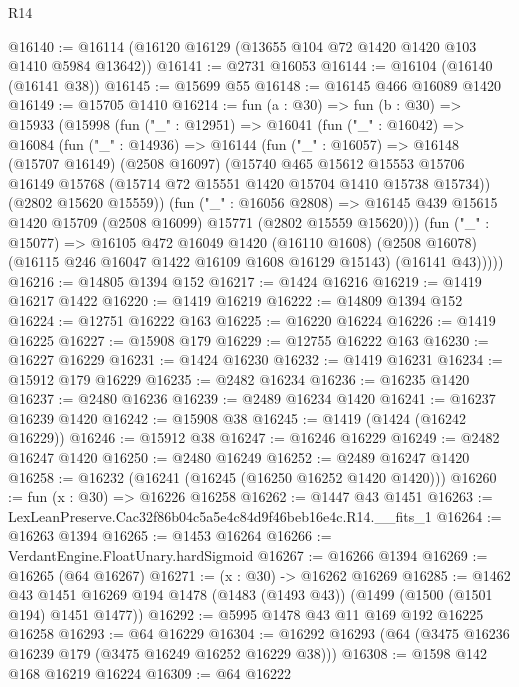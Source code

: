 \begin{lexlean}{R14}
\begin{coremodule}
@16140 := @16114 (@16120 @16129 (@13655 @104 @72 @1420 @1420 @103 @1410 @5984 @13642))
@16141 := @2731 @16053
@16144 := @16104 (@16140 (@16141 @38))
@16145 := @15699 @55
@16148 := @16145 @466 @16089 @1420
@16149 := @15705 @1410
@16214 := fun (a : @30) =>
  fun (b : @30) =>
  @15933
    (@15998
      (fun ("_" : @12951) =>
      @16041
        (fun ("_" : @16042) =>
        @16084
          (fun ("_" : @14936) =>
          @16144
            (fun ("_" : @16057) =>
            @16148
              (@15707 @16149)
              (@2508 @16097)
              (@15740
                @465
                @15612
                @15553
                @15706
                @16149
                @15768
                (@15714 @72 @15551 @1420 @15704 @1410 @15738 @15734))
              (@2802 @15620 @15559))
            (fun ("_" : @16056 @2808) =>
            @16145 @439 @15615 @1420 @15709 (@2508 @16099) @15771 (@2802 @15559 @15620)))
          (fun ("_" : @15077) =>
          @16105
            @472
            @16049
            @1420
            (@16110 @1608)
            (@2508 @16078)
            (@16115 @246 @16047 @1422 @16109 @1608 @16129 @15143)
            (@16141 @43)))))
@16216 := @14805 @1394 @152
@16217 := @1424 @16216
@16219 := @1419 @16217 @1422
@16220 := @1419 @16219
@16222 := @14809 @1394 @152
@16224 := @12751 @16222 @163
@16225 := @16220 @16224
@16226 := @1419 @16225
@16227 := @15908 @179
@16229 := @12755 @16222 @163
@16230 := @16227 @16229
@16231 := @1424 @16230
@16232 := @1419 @16231
@16234 := @15912 @179 @16229
@16235 := @2482 @16234
@16236 := @16235 @1420
@16237 := @2480 @16236
@16239 := @2489 @16234 @1420
@16241 := @16237 @16239 @1420
@16242 := @15908 @38
@16245 := @1419 (@1424 (@16242 @16229))
@16246 := @15912 @38
@16247 := @16246 @16229
@16249 := @2482 @16247 @1420
@16250 := @2480 @16249
@16252 := @2489 @16247 @1420
@16258 := @16232 (@16241 (@16245 (@16250 @16252 @1420 @1420)))
@16260 := fun (x : @30) => @16226 @16258
@16262 := @1447 @43 @1451
@16263 := LexLeanPreserve.Cac32f86b04c5a5e4c84d9f46beb16e4c.R14.__fits_1
@16264 := @16263 @1394
@16265 := @1453 @16264
@16266 := VerdantEngine.FloatUnary.hardSigmoid
@16267 := @16266 @1394
@16269 := @16265 (@64 @16267)
@16271 := (x : @30) -> @16262 @16269
@16285 := @1462
    @43
    @1451
    @16269
    @194
    @1478
    (@1483 (@1493 @43))
    (@1499 (@1500 (@1501 @194) @1451 @1477))
@16292 := @5995 @1478 @43 @11 @169 @192 @16225 @16258
@16293 := @64 @16229
@16304 := @16292 @16293 (@64 (@3475 @16236 @16239 @179 (@3475 @16249 @16252 @16229 @38)))
@16308 := @1598 @142 @168 @16219 @16224
@16309 := @64 @16222

\end{coremodule}
\end{lexlean}
